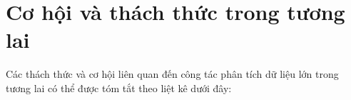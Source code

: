 \documentclass[utf8]{frontiersSCNS} %
\begin{document}
\section{Cơ hội và thách thức trong tương lai}



Các thách thức và cơ hội liên quan đến công tác phân tích dữ liệu lớn trong tương lai có thể được tóm tắt theo liệt kê dưới đây:
\end{document}
